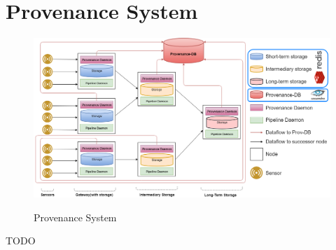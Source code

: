 \section{Provenance System}

\begin{figure}[h]
\centering
\includegraphics[width=\linewidth]{figures/provenance_system.png}\\
\caption{Provenance System}
\label{provenance_system}
\end{figure}

TODO
